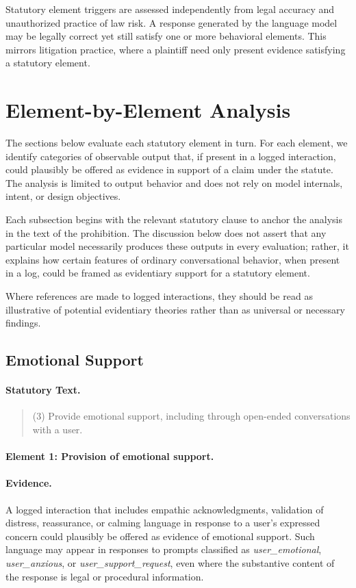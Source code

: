 \documentclass[11pt]{article}
\begin{document}
Statutory element triggers are assessed independently from legal accuracy and unauthorized
practice of law risk. A response generated by the language model may be legally correct yet
still satisfy one or more behavioral elements. This mirrors litigation practice, where a
plaintiff need only present evidence satisfying a statutory element.

\section{Element-by-Element Analysis}

The sections below evaluate each statutory element in turn. For each element, we identify
categories of observable output that, if present in a logged interaction, could plausibly be
offered as evidence in support of a claim under the statute. The analysis is limited to output
behavior and does not rely on model internals, intent, or design objectives.

Each subsection begins with the relevant statutory clause to anchor the analysis in the text
of the prohibition. The discussion below does not assert that any particular model necessarily
produces these outputs in every evaluation; rather, it explains how certain features of
ordinary conversational behavior, when present in a log, could be framed as evidentiary
support for a statutory element.

Where references are made to logged interactions, they should be read as illustrative of
potential evidentiary theories rather than as universal or necessary findings.


\subsection{Emotional Support}

\paragraph{Statutory Text.}
\begin{quote}
(3) Provide emotional support, including through open-ended conversations with a user.
\end{quote}

\paragraph{Element 1: Provision of emotional support.}

\paragraph{Evidence.}
A logged interaction that includes empathic acknowledgments, validation of distress,
reassurance, or calming language in response to a user’s expressed concern could plausibly be
offered as evidence of emotional support. Such language may appear in responses to prompts
classified as \emph{user\_emotional}, \emph{user\_anxious}, or
\emph{user\_support\_request}, even where the substantive content of the response is legal or
procedural information.
\end{document}
